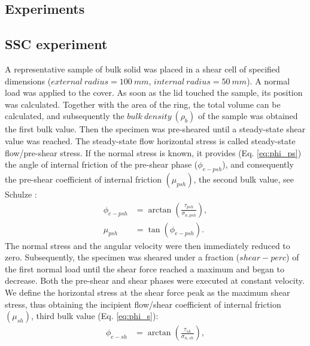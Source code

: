 \documentclass[review]{elsarticle}
\begin{document}
\begin{appendix}
\section{Experiments}
\label{sec:appexperiments}

\subsection{SSC experiment}
\label{subsec:srsctexperiment}
A representative sample of bulk solid was placed in a shear cell of specified
dimensions ($external ~ radius = 100 ~ mm$, $internal ~ radius = 50 ~ mm$).
A normal load was applied to the cover. As soon as the lid touched the sample,
its position was calculated.
Together with the area of the ring, the total volume can be calculated, and subsequently the $bulk ~ density ~ (\rho_b)$ 
of the sample was obtained the first bulk value.
Then the specimen was pre-sheared until a steady-state shear value was reached.
The steady-state flow horizontal stress
is called steady-state flow/pre-shear stress.
If the normal stress is known, it provides (Eq. \ref{eq:phi_ps}) the angle of
internal friction of the pre-shear phase ($\phi_{e-psh}$), and consequently the
pre-shear coefficient of internal friction $ (\mu_{psh})$, the second
bulk value, see Schulze \cite{RefWorks:118}:
\begin{equation}
\begin{aligned}
\phi_{e-psh} &= \arctan \left(\frac{\tau_{psh}}{\sigma_{n,psh}} \right) ,\\
\mu_{psh} &=\tan(\phi_{e-psh}) .
\end{aligned}
 \label{eq:phi_ps}
\end{equation}
The normal stress and the angular velocity were then immediately reduced to zero. 
Subsequently, the specimen was sheared under a fraction ($shear-perc$) of the first normal load until the shear force 
reached a maximum and began to decrease. 
Both the pre-shear and shear phases were executed at constant velocity. 
We define the horizontal stress at the shear force peak as the maximum shear
stress, thus obtaining the incipient flow/shear coefficient of internal friction $
(\mu_{sh})$, third bulk value (Eq. \ref{eq:phi_s})\cite{RefWorks:118}:
\begin{equation}
\begin{aligned}
\phi_{e-sh} &= \arctan \left(\frac{\tau_{sh}}{\sigma_{n,sh}} \right) ,\\

\end{aligned}
\end{equation}
\end{appendix}
\end{document}
